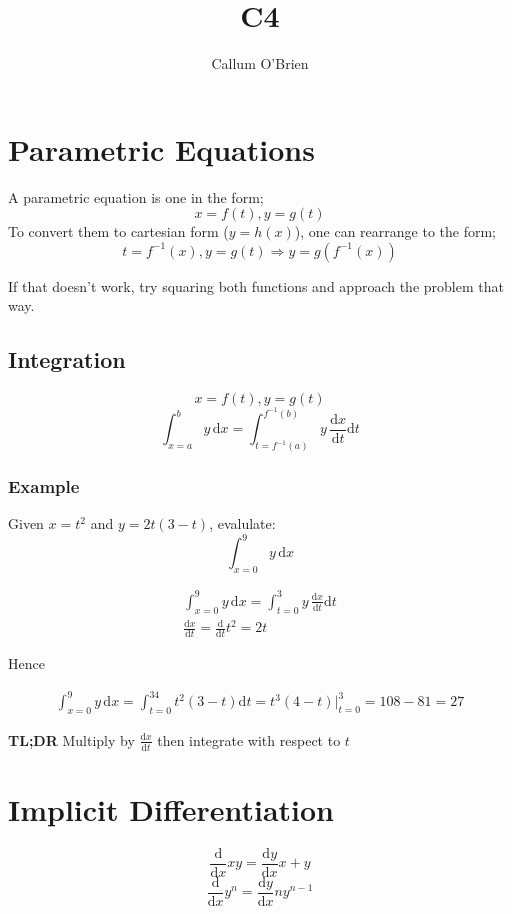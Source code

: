 \documentclass{article}
\title{C4}
\author{Callum O'Brien}
\begin{document}
\maketitle
\tableofcontents
\newpage

\section{Parametric Equations}

A parametric equation is one in the form;
\[x=f(t),y=g(t)\]
\noindent To convert them to cartesian form ($y=h(x)$), one can rearrange to the form;
\[t=f^{-1}(x),y=g(t)\Rightarrow y=g(f^{-1}(x))\]

\noindent If that doesn't work, try squaring both functions and approach the problem that way.

\subsection{Integration}

\[x=f(t),y=g(t)\]
\[\int_{x=a}^{b}y\,\textrm{d}x=\int_{t=f^{-1}(a)}^{f^{-1}(b)}y\,\frac{\textrm{d}x}{\textrm{d}t}\textrm{d}t\]

\subsubsection{Example}
Given $x=t^2$ and $y=2t(3-t)$, evalulate:
\[\int_{x=0}^9y\,\textrm{d}x\]

\begin{eqnarray}
	\int_{x=0}^9y\,\textrm{d}x=\int_{t=0}^3y\,\frac{\textrm{d}x}{\textrm{d}t}\textrm{d}t\\
	\frac{\textrm{d}x}{\textrm{d}t}=\frac{\textrm{d}}{\textrm{d}t}t^2=2t
\end{eqnarray}

Hence

\begin{eqnarray}
	\int_{x=0}^9y\,\textrm{d}x=\int_{t=0}^34t^2(3-t)\textrm{d}t=t^3(4-t)|_{t=0}^3=108-81=27
\end{eqnarray}

\noindent \textbf{TL;DR} Multiply by $\frac{\textrm{d}x}{\textrm{d}t}$ then integrate with respect to $t$

\section{Implicit Differentiation}

\[\frac{\textrm{d}}{\textrm{d}x}xy=\frac{\textrm{d}y}{\textrm{d}x}x+y\]
\[\frac{\textrm{d}}{\textrm{d}x}y^n=\frac{\textrm{d}y}{\textrm{d}x}ny^{n-1}\]
\end{document}
